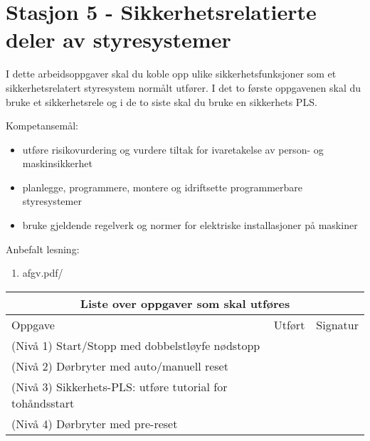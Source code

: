 
\noindent
\section*{Stasjon 5 - Sikkerhetsrelatierte deler av styresystemer}

\vskip 5pt
I dette arbeidsoppgaver skal du koble opp ulike sikkerhetsfunksjoner som et sikkerhetsrelatert styresystem normålt utfører. I det to første oppgavenen skal du bruke et sikkerhetsrele og i de to siste skal du bruke en sikkerhets PLS. 

\vskip 5pt 
Kompetansemål:
\begin{itemize}[noitemsep]

	\item utføre risikovurdering og vurdere tiltak for ivaretakelse av person- og maskinsikkerhet
	\item planlegge, programmere, montere og idriftsette programmerbare styresystemer
	\item bruke gjeldende regelverk og normer for elektriske installasjoner på maskiner
\end{itemize}

Anbefalt lesning:

\begin{enumerate}
	\item afgv.pdf/ 
\end{enumerate}


\begin{center}
\begin{tabular}{ | m{10cm} | m{1cm}| m{2cm} | } 
\hline
\multicolumn{3}{|c|}{Liste over oppgaver som skal utføres} \\
	\hline
	Oppgave	& Utført & Signatur \\ 
	\hline
	\cellcolor{green!60}(Nivå 1) Start/Stopp med dobbelstløyfe nødstopp &&\\
	\hline
	\cellcolor{yellow!60}(Nivå 2) Dørbryter med auto/manuell reset & & \\ 
	\hline
	\cellcolor{orange!60}(Nivå 3) Sikkerhets-PLS: utføre tutorial for tohåndsstart	& & \\ 
	\hline
	\cellcolor{red!60}(Nivå 4) Dørbryter med pre-reset & & \\ 
	\hline
\end{tabular}
\end{center}

